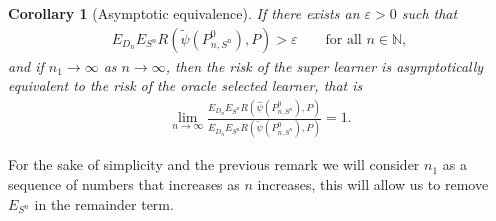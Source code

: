 \documentclass[11pt, a4paper]{article}
\newtheorem{corollary}[theorem]{Corollary}
\theoremstyle{definition}
\theoremstyle{remark}
\newcommand{\la}{\psi}
\newcommand{\Sn}{S^n}
\begin{document}
\begin{corollary}[Asymptotic equivalence] 
    If there exists an $ \varepsilon > 0 $ such that 
   \begin{align*}
       E_{D_n} E_{\Sn} R(\tilde{\la}(P_{n, \Sn}^{0}), P) > \varepsilon \qquad \text{for all } n \in \mathbb{N},
   \end{align*}
   and if $ n_1 \to \infty $ as $ n \to \infty $, then the risk of the super learner is asymptotically equivalent to the risk of the oracle selected learner, that is
   \begin{align*}
       \lim_{n \to \infty} \frac{E_{D_n} E_{\Sn} R(\hat{\la}(P_{n, \Sn}^{0}), P)}{E_{D_n} E_{\Sn} R(\tilde{\la}(P_{n, \Sn}^{0}), P)} = 1.
   \end{align*}
\end{corollary}
For the sake of simplicity and the previous remark we will consider $ n_1 $ as a sequence of numbers that increases as $ n $ increases, this will allow us to remove $ E_{\Sn} $ in the remainder term. 
\end{document}

